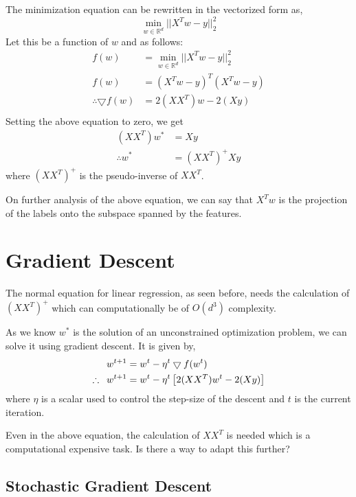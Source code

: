 \documentclass[
]{article}
\begin{document}
The minimization equation can be rewritten in the vectorized form as, \[
\min _{w \in \mathbb{R}^d} || X^Tw - y || ^2 _2
\] Let this be a function of \(w\) and as follows: \begin{align*}
f(w) &= \min _{w \in \mathbb{R}^d} || X^Tw - y || ^2 _2 \\
f(w) &= (X^Tw - y)^T(X^Tw - y) \\
\therefore\bigtriangledown f(w) &= 2(XX^T)w - 2(Xy) \\
\end{align*} Setting the above equation to zero, we get \begin{align*}
(XX^T)w^* &= Xy \\
\therefore w^* &= (XX^T)^+Xy
\end{align*} where \((XX^T)^+\) is the pseudo-inverse of \(XX^T\).

On further analysis of the above equation, we can say that \(X^Tw\) is
the projection of the labels onto the subspace spanned by the features.

\hypertarget{gradient-descent}{%
\section{Gradient Descent}\label{gradient-descent}}

The normal equation for linear regression, as seen before, needs the
calculation of \((XX^T)^+\) which can computationally be of \(O(d^3)\)
complexity.

As we know \(w^*\) is the solution of an unconstrained optimization
problem, we can solve it using gradient descent. It is given by,
\begin{align*}
w^{t+1} &= w^t - \eta^t \bigtriangledown f(w^t) \\
\therefore \hspace{0.5em} w^{t+1} &= w^t - \eta^t \left [ 2(XX^T)w^t - 2(Xy) \right ]
\end{align*} where \(\eta\) is a scalar used to control the step-size of
the descent and \(t\) is the current iteration.

Even in the above equation, the calculation of \(XX^T\) is needed which
is a computational expensive task. Is there a way to adapt this further?

\hypertarget{stochastic-gradient-descent}{%
\subsection{Stochastic Gradient
Descent}\label{stochastic-gradient-descent}}
\end{document}
